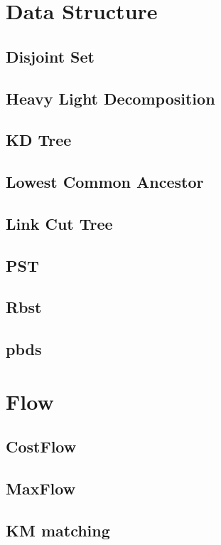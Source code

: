 \section{Data Structure}
\subsection{Disjoint Set}

\subsection{Heavy Light Decomposition}

\subsection{KD Tree}

\subsection{Lowest Common Ancestor}

\subsection{Link Cut Tree}

\subsection{PST}

\subsection{Rbst}

\subsection{pbds}


\section{Flow}
\subsection{CostFlow}

\subsection{MaxFlow}

\subsection{KM matching}

